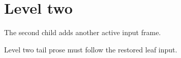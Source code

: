 \section*{Level two}
The second child adds another active input frame.

\newpage


\newpage
Level two tail prose must follow the restored leaf input.
